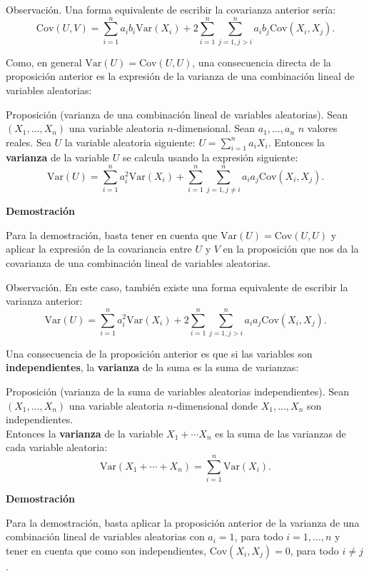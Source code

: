 \documentclass[]{book}
\begin{document}
 Observación.
Una forma equivalente de escribir la covarianza anterior sería:
\[
\mathrm{Cov}(U,V)=\sum_{i=1}^n a_i b_i \mathrm{Var}(X_i)+2\sum_{i=1}^n\sum_{j=1,j>i}^n a_i b_j \mathrm{Cov}(X_i,X_j).
\]

Como, en general \(\mathrm{Var}(U)=\mathrm{Cov}(U,U)\), una consecuencia directa de la proposición anterior es la expresión de la varianza de una combinación lineal de variables aleatorias:

Proposición (varianza de una combinación lineal de variables aleatorias).
Sean \((X_1,\ldots,X_n)\) una variable aleatoria \(n\)-dimensional. Sean \(a_1, \ldots, a_n\) \(n\) valores reales. Sea \(U\) la variable aleatoria siguiente:
\(U=\sum\limits_{i=1}^n a_i X_i.\)
Entonces la \textbf{varianza} de la variable \(U\) se calcula usando la expresión siguiente:
\[
\mathrm{Var}(U)=\sum_{i=1}^n a_i^2 \mathrm{Var}(X_i)+\sum_{i=1}^n\sum_{j=1,j\neq i}^n a_i a_j \mathrm{Cov}(X_i,X_j).
\]

\textbf{Demostración}

Para la demostración, basta tener en cuenta que \(\mathrm{Var}(U)=\mathrm{Cov}(U,U)\) y aplicar la expresión de la covariancia entre \(U\) y \(V\) en la proposición que nos da la covarianza de una combinación lineal de variables aleatorias.

 Observación.
En este caso, también existe una forma equivalente de escribir la varianza anterior:
\[
\mathrm{Var}(U)=\sum_{i=1}^n a_i^2 \mathrm{Var}(X_i)+2\sum_{i=1}^n\sum_{j=1,j>i}^n a_i a_j \mathrm{Cov}(X_i,X_j).
\]

Una consecuencia de la proposición anterior es que si las variables son \textbf{independientes}, la \textbf{varianza} de la suma es la suma de varianzas:

Proposición (varianza de la suma de variables aleatorias independientes).
Sean \((X_1,\ldots,X_n)\) una variable aleatoria \(n\)-dimensional donde \(X_1,\ldots, X_n\) son independientes.\\
Entonces la \textbf{varianza} de la variable \(X_1+\cdots X_n\) es la suma de las varianzas de cada variable aleatoria:
\[
\mathrm{Var}(X_1+\cdots + X_n)=\sum_{i=1}^n \mathrm{Var}(X_i).
\]

\textbf{Demostración}

Para la demostración, basta aplicar la proposición anterior de la varianza de una combinación lineal de variables aleatorias con \(a_i=1\), para todo \(i=1,\ldots,n\) y tener en cuenta que como son independientes, \(\mathrm{Cov}(X_i,X_j)=0\), para todo \(i\neq j\).
\end{document}
